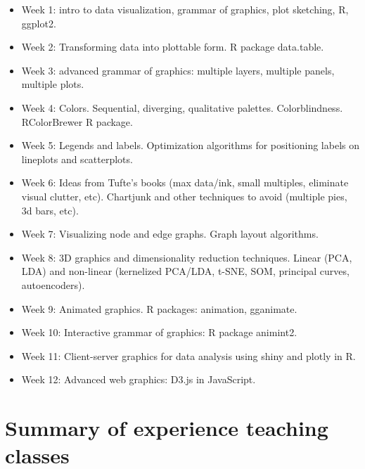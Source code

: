\documentclass{article}
\begin{document}
\begin{itemize}
\item Week 1: intro to data visualization, grammar of graphics, plot
  sketching, R, ggplot2.
\item Week 2: Transforming data into plottable form. R package
  data.table.
\item Week 3: advanced grammar of graphics: multiple layers, multiple
  panels, multiple plots.
\item Week 4: Colors. Sequential, diverging, qualitative palettes.
  Colorblindness. RColorBrewer R package.
\item Week 5: Legends and labels. Optimization algorithms for positioning
  labels on lineplots and scatterplots.
\item Week 6: Ideas from Tufte's books (max data/ink, small multiples,
  eliminate visual clutter, etc). Chartjunk and other techniques to
  avoid (multiple pies, 3d bars, etc).
\item Week 7: Visualizing node and edge graphs. Graph layout algorithms.
\item Week 8: 3D graphics and dimensionality reduction techniques. Linear
  (PCA, LDA) and non-linear (kernelized PCA/LDA, t-SNE, SOM, principal
  curves, autoencoders).
\item Week 9: Animated graphics. R packages: animation, gganimate.
\item Week 10: Interactive grammar of graphics: R package animint2.
\item Week 11: Client-server graphics for data analysis using shiny
  and plotly in R.
\item Week 12: Advanced web graphics: D3.js in JavaScript.
\end{itemize}

\section{Summary of experience teaching classes} 

\end{document}
